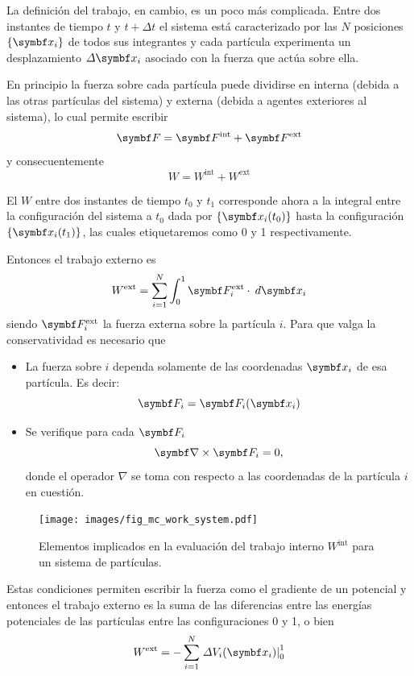 \documentclass[10pt,oneside]{CBFT_book}
\begin{document}
La definición del trabajo, en cambio, es un poco más complicada. Entre dos instantes de tiempo $ t $ y $ t + \Delta t $ 
el sistema está caracterizado por las $ N $ posiciones $ \{\vb{x}_i\} $ de todos sus integrantes y cada partícula 
experimenta un desplazamiento $ \Delta \vb{x}_i $ asociado con la fuerza que actúa sobre ella.

En principio la fuerza sobre cada partícula puede dividirse en interna (debida a las otras partículas del sistema) y 
externa (debida a agentes exteriores al sistema), lo cual permite escribir
\[
	\vb{F} = \vb{F}^{\text{int}} + \vb{F}^{\text{ext}}
\]
y consecuentemente
\[
	W = W^{\text{int}} + W^{\text{ext}}
\]

El $ W $ entre dos instantes de tiempo $t_0$ y $t_1$ corresponde ahora a la integral entre la configuración del sistema 
a $t_0$ dada por $ \{\vb{x}_i(t_0)\} $ hasta la configuración $ \{\vb{x}_i(t_1)\} $, las cuales etiquetaremos como 0 y 
1 respectivamente. 

Entonces el trabajo externo es
\[
	W^{\text{ext}} = \sum_{i=1}^N \int_0^1 \vb{F}^{\text{ext}}_i \cdot \: d\vb{x}_i
\]
siendo $ \vb{F}^{\text{ext}}_i $ la fuerza externa sobre la partícula $i$. Para que valga la conservatividad es 
necesario que 
\begin{itemize}
 \item La fuerza sobre $i$ dependa solamente de las coordenadas $\vb{x}_i$ de esa partícula. Es decir:
 \[
	\vb{F}_i = \vb{F}_i(\vb{x}_i)
 \]
 \item Se verifique para cada $\vb{F}_i$ 
 \[
	\Nabla \times \vb{F}_i = 0,
 \]
 donde el operador $\nabla$ se toma con respecto a las coordenadas de la partícula $i$ en cuestión.
\end{itemize}

\begin{figure}[!hb]
	\begin{center}
	\texttt{[image: images/fig\_mc\_work\_system.pdf]}	
	\end{center}
	\caption{Elementos implicados en la evaluación del trabajo interno $ W^{\text{int}} $ para un sistema
	de partículas.}
	\label{fig_mc_work_system}
\end{figure} 


Estas condiciones permiten escribir la fuerza como el gradiente de un potencial y entonces el trabajo externo es la 
suma de las diferencias entre las energías potenciales de las partículas entre las configuraciones 0 y 1, o bien
\[
	W^{\text{ext}} = - \sum_{i=1}^N \left. \Delta V_i(\vb{x}_i) \right|_0^1
\]
\end{document}
